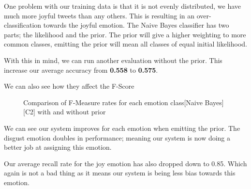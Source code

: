 One problem with our training data is that it is not evenly distributed, we have much more joyful tweets than any others. This is resulting in an over-classification towards the joyful emotion. The Naive Bayes classifier has two parts; the likelihood and the prior. The prior will give a higher weighting to more common classes, emitting the prior will mean all classes of equal initial likelihood.

With this in mind, we can run another evaluation without the prior. This increase our average accuracy from \textbf{0.558} to \textbf{0.575}. 

We can also see how they affect the F-Score

\begin{figure}[H]
\center
{}
\caption{Comparison of F-Measure rates for each emotion class[Naive Bayes][C2] with and without prior}
\end{figure}

We can see our system improves for each emotion when emitting the prior. The disgust emotion doubles in performance; meaning our system is now doing a better job at assigning this emotion.

Our average recall rate for the joy emotion has also dropped down to 0.85. Which again is not a bad thing as it means our system is being less bias towards this emotion.


